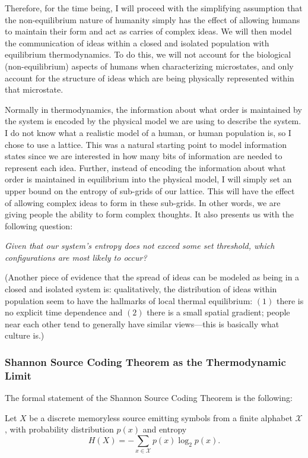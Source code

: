 \documentclass{article}
\begin{document}
Therefore, for the time being, I will proceed with the simplifying assumption that the non-equilibrium nature of humanity simply has the effect of allowing humans to maintain their form and act as carries of complex ideas. We will then model the communication of ideas within a closed and isolated population with equilibrium thermodynamics. To do this, we will not account for the biological (non-equilibrium) aspects of humans when characterizing microstates, and only account for the structure of ideas which are being physically represented within that microstate.

Normally in thermodynamics, the information about what order is maintained by the system is encoded by the physical model we are using to describe the system. I do not know what a realistic model of a human, or human population is, so I chose to use a lattice. This was a natural starting point to model information states since we are interested in how many bits of information are needed to represent each idea. Further, instead of encoding the information about what order is maintained in equilibrium into the physical model, I will simply set an upper bound on the entropy of sub-grids of our lattice.  This will have the effect of allowing complex ideas to form in these sub-grids. In other words, we are giving people the ability to form complex thoughts. It also presents us with the following question:

\emph{Given that our system's entropy does not exceed some set threshold, which configurations are most likely to occur?}

(Another piece of evidence that the spread of ideas can be modeled as being in a closed and isolated system is: qualitatively, the distribution of ideas within population seem to have the hallmarks of local thermal equilibrium: $(1)$ there is no explicit time dependence and $(2)$ there is a small spatial gradient; people near each other tend to generally have similar views––this is basically what culture is.)

\subsubsection{Shannon Source Coding Theorem as the Thermodynamic Limit}
The formal statement of the Shannon Source Coding Theorem is the following:

Let \( X \) be a discrete memoryless source emitting symbols from a finite alphabet \( \mathcal{X} \), with probability distribution \( p(x) \) and entropy
\[
H(X) = -\sum_{x \in \mathcal{X}} p(x) \log_2 p(x).
\]
\end{document}
